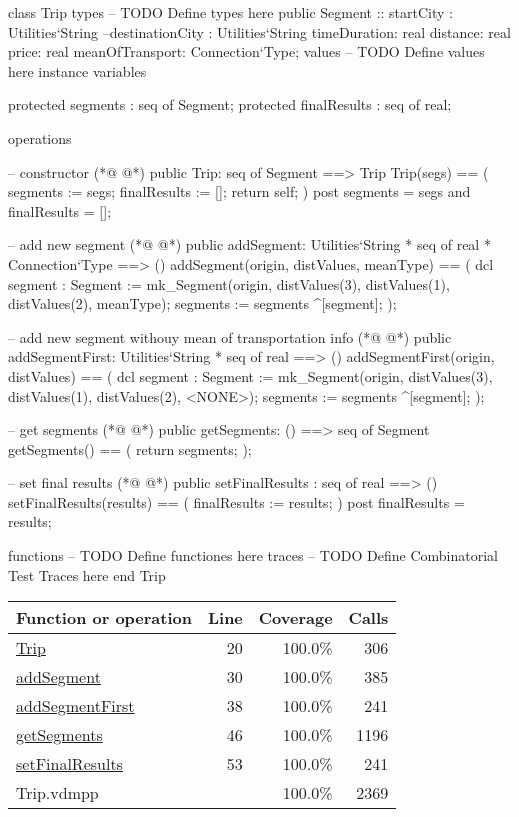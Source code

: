\begin{vdmpp}[breaklines=true]
class Trip
types
-- TODO Define types here
 public Segment :: startCity : Utilities`String
           --destinationCity : Utilities`String
           timeDuration: real
           distance: real
           price: real
           meanOfTransport: Connection`Type;
values
-- TODO Define values here
instance variables

 protected segments : seq of Segment;
 protected finalResults : seq of real;
 
operations
 
 -- constructor
(*@
\label{Trip:20}
@*)
 public Trip: seq of Segment ==> Trip
 Trip(segs) ==
 (
  segments := segs;
  finalResults := [];
  return self;
 )
 post segments = segs and finalResults = [];
 
 -- add new segment
(*@
\label{addSegment:30}
@*)
 public addSegment: Utilities`String * seq of real * Connection`Type ==> ()
 addSegment(origin, distValues, meanType) ==
 (
  dcl segment : Segment := mk_Segment(origin, distValues(3), distValues(1), distValues(2), meanType);
  segments := segments ^[segment]; 
 );
 
 -- add new segment withouy mean of transportation info
(*@
\label{addSegmentFirst:38}
@*)
 public addSegmentFirst: Utilities`String * seq of real ==> ()
 addSegmentFirst(origin, distValues) ==
 (
  dcl segment : Segment := mk_Segment(origin, distValues(3), distValues(1), distValues(2), <NONE>);
  segments := segments ^[segment]; 
 );
 
 -- get segments
(*@
\label{getSegments:46}
@*)
 public getSegments: () ==> seq of Segment
 getSegments() ==
 (
  return segments;
 );
 
 -- set final results
(*@
\label{setFinalResults:53}
@*)
 public setFinalResults : seq of real ==> ()
 setFinalResults(results) ==
 (
  finalResults := results;
 )
 post finalResults = results;

functions
-- TODO Define functiones here
traces
-- TODO Define Combinatorial Test Traces here
end Trip
\end{vdmpp}
\bigskip
\begin{longtable}{|l|r|r|r|}
\hline
Function or operation & Line & Coverage & Calls \\
\hline
\hline
\hyperref[Trip:20]{Trip} & 20&100.0\% & 306 \\
\hline
\hyperref[addSegment:30]{addSegment} & 30&100.0\% & 385 \\
\hline
\hyperref[addSegmentFirst:38]{addSegmentFirst} & 38&100.0\% & 241 \\
\hline
\hyperref[getSegments:46]{getSegments} & 46&100.0\% & 1196 \\
\hline
\hyperref[setFinalResults:53]{setFinalResults} & 53&100.0\% & 241 \\
\hline
\hline
Trip.vdmpp & & 100.0\% & 2369 \\
\hline
\end{longtable}

